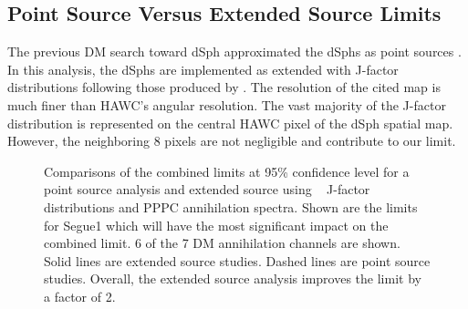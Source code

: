 \subsection{Point Source Versus Extended Source Limits}\label{sec:gd_ext_limitvs_ptsrc}

The previous DM search toward dSph approximated the dSphs as point sources \cite{Albert_2018}.
In this analysis, the dSphs are implemented as extended with J-factor distributions following those produced by \cite{Geringer-Sameth:2014yza}.
The resolution of the cited map is much finer than HAWC's angular resolution.
The vast majority of the J-factor distribution is represented on the central HAWC pixel of the dSph spatial map.
However, the neighboring 8 pixels are not negligible and contribute to our limit.

\begin{figure}[ht]
    \caption{Comparisons of the combined limits at 95\% confidence level for a point source analysis and extended source using ~\cite{Geringer-Sameth:2014yza} \GS J-factor distributions and PPPC \cite{Cirelli_2011} annihilation spectra. Shown are the limits for Segue1 which will have the most significant impact on the combined limit. 6 of the 7 DM annihilation channels are shown. Solid lines are extended source studies. Dashed lines are point source studies. Overall, the extended source analysis improves the limit by a factor of 2.}
\label{fig:Seg1point_versus_extended}
\end{figure}


